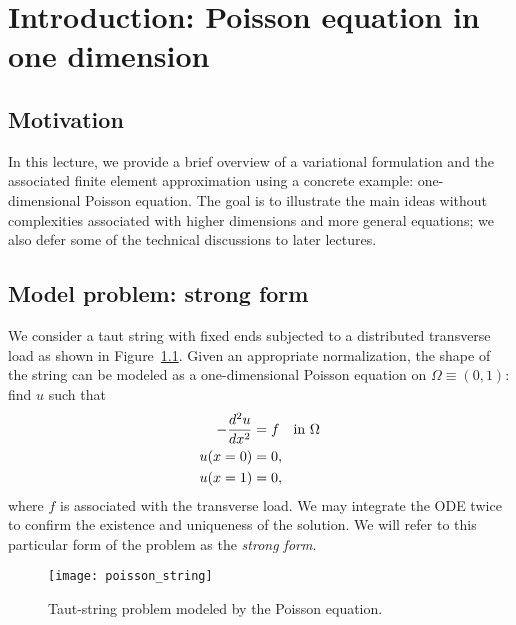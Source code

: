 \chapter{Introduction: Poisson equation in one dimension}

\disclaimer

\section{Motivation}
In this lecture, we provide a brief overview of a variational formulation and the associated finite element approximation using a concrete example: one-dimensional Poisson equation. The goal is to illustrate the main ideas without complexities associated with higher dimensions and more general equations; we also defer some of the technical discussions to later lectures.

\section{Model problem: strong form}
\label{sec:intro_strong}
We consider a taut string with fixed ends subjected to a distributed transverse load as shown in Figure~\ref{fig:intro_string}.  Given an appropriate normalization, the shape of the string can be modeled as a one-dimensional Poisson equation on $\Omega \equiv (0,1)$: find $u$ such that
\begin{align}
  - \frac{d ^2u}{d x^2} &= f \quad \text{in } \Omega  \label{eq:intro_strong} \\
  u(x=0) &= 0 \notag , \\
  u(x=1) &= 0 \notag ,
\end{align}
where $f$ is associated with the transverse load.  We may integrate the ODE twice to confirm the existence and uniqueness of the solution.  We will refer to this particular form of the problem as the \emph{strong form}.

\begin{figure}
  \centering
  \texttt{[image: poisson\_string]}
  \caption{Taut-string problem modeled by the Poisson equation. \label{fig:intro_string}}
\end{figure}


